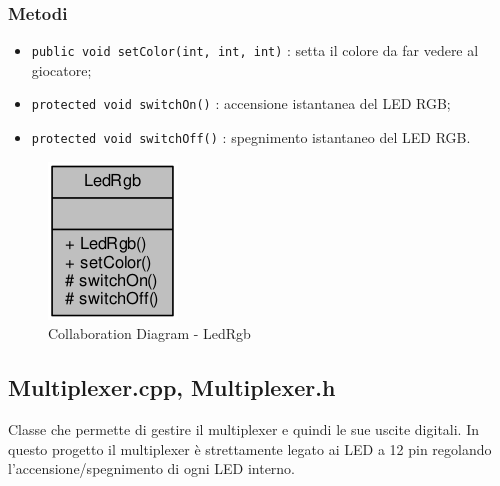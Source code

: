 \subsubsection{Metodi}
\begin{itemize}
	\item \texttt{public void setColor(int, int, int)} : setta il colore da far vedere al giocatore;
	\item \texttt{protected	void switchOn()} : accensione istantanea del LED RGB;
	\item \texttt{protected	void switchOff()} : spegnimento istantaneo del LED RGB.
\end{itemize}
\begin{figure}[!ht]
	\centering
	\includegraphics[scale=.5]{img/UML/CollaborationDiagram/LedRgb.png}
	\caption{Collaboration Diagram - LedRgb}
\end{figure}

\newpage
\subsection{Multiplexer.cpp, Multiplexer.h}
Classe che permette di gestire il multiplexer e quindi le sue uscite digitali. In questo progetto il multiplexer è strettamente legato ai LED a 12 pin regolando l'accensione/spegnimento di ogni LED interno.
